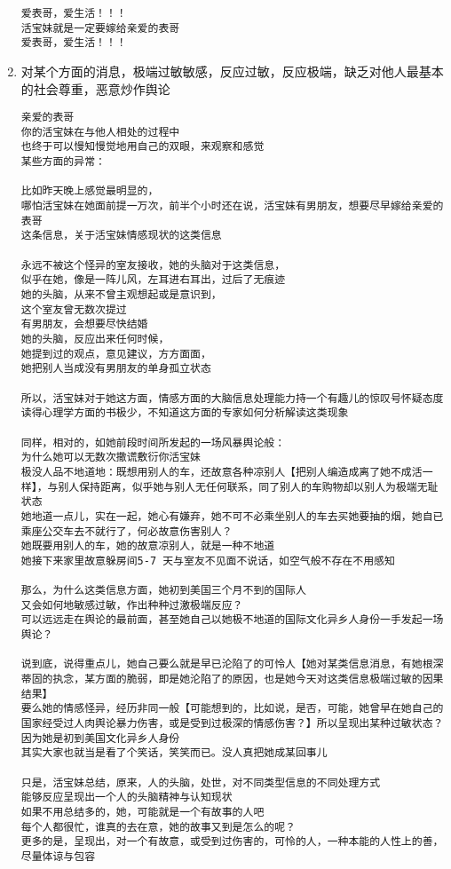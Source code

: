\documentclass[9pt, b5paper]{article}
\begin{document}
\begin{enumerate}
\begin{verbatim}
爱表哥，爱生活！！！
活宝妹就是一定要嫁给亲爱的表哥
爱表哥，爱生活！！！
\end{verbatim}
\item 对某个方面的消息，极端过敏敏感，反应过敏，反应极端，缺乏对他人最基本的社会尊重，恶意炒作舆论
\label{sec-3-2-3-2}
\begin{verbatim}
亲爱的表哥
你的活宝妹在与他人相处的过程中
也终于可以慢知慢觉地用自己的双眼，来观察和感觉
某些方面的异常：

比如昨天晚上感觉最明显的，
哪怕活宝妹在她面前提一万次，前半个小时还在说，活宝妹有男朋友，想要尽早嫁给亲爱的表哥
这条信息，关于活宝妹情感现状的这类信息

永远不被这个怪异的室友接收，她的头脑对于这类信息，
似乎在她，像是一阵儿风，左耳进右耳出，过后了无痕迹
她的头脑，从来不曾主观想起或是意识到，
这个室友曾无数次提过
有男朋友，会想要尽快结婚
她的头脑，反应出来任何时候，
她提到过的观点，意见建议，方方面面，
她把别人当成没有男朋友的单身孤立状态 

所以，活宝妹对于她这方面，情感方面的大脑信息处理能力持一个有趣儿的惊叹号怀疑态度
读得心理学方面的书极少，不知道这方面的专家如何分析解读这类现象

同样，相对的，如她前段时间所发起的一场风暴舆论般：
为什么她可以无数次撒谎敷衍你活宝妹
极没人品不地道地：既想用别人的车，还故意各种凉别人【把别人编造成离了她不成活一样】，与别人保持距离，似乎她与别人无任何联系，同了别人的车购物却以别人为极端无耻状态
她地道一点儿，实在一起，她心有嫌弃，她不可不必乘坐别人的车去买她要抽的烟，她自已乘座公交车去不就行了，何必故意伤害别人？
她既要用别人的车，她的故意凉别人，就是一种不地道
她接下来家里故意躲房间5-7 天与室友不见面不说话，如空气般不存在不用感知

那么，为什么这类信息方面，她初到美国三个月不到的国际人
又会如何地敏感过敏，作出种种过激极端反应？
可以远远走在舆论的最前面，甚至她自己以她极不地道的国际文化异乡人身份一手发起一场舆论？

说到底，说得重点儿，她自己要么就是早已沦陷了的可怜人【她对某类信息消息，有她根深蒂固的执念，某方面的脆弱，即是她沦陷了的原因，也是她今天对这类信息极端过敏的因果结果】
要么她的情感怪异，经历非同一般【可能想到的，比如说，是否，可能，她曾早在她自己的国家经受过人肉舆论暴力伤害，或是受到过极深的情感伤害？】所以呈现出某种过敏状态？
因为她是初到美国文化异乡人身份
其实大家也就当是看了个笑话，笑笑而已。没人真把她成某回事儿

只是，活宝妹总结，原来，人的头脑，处世，对不同类型信息的不同处理方式
能够反应呈现出一个人的头脑精神与认知现状
如果不用总结多的，她，可能就是一个有故事的人吧
每个人都很忙，谁真的去在意，她的故事又到是怎么的呢？
更多的是，呈现出，对一个有故意，或受到过伤害的，可怜的人，一种本能的人性上的善，尽量体谅与包容


\end{verbatim}
\end{enumerate}
\end{document}
